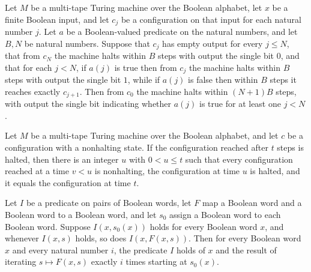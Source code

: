 \begin{theorem}
\label{Turing.loop_run}
\leanok
{}
Let $M$ be a multi-tape Turing machine over the Boolean alphabet, let $x$ be a finite
Boolean input, and let $c_j$ be a configuration on that input for each natural number
$j$. Let $a$ be a Boolean-valued predicate on the natural numbers, and let $B,N$ be
natural numbers. Suppose that $c_j$ has empty output for every $j\le N$, that from $c_N$
the machine halts within $B$ steps with output the single bit $0$, and that for each
$j<N$, if $a(j)$ is true then from $c_j$ the machine halts within $B$ steps with output
the single bit $1$, while if $a(j)$ is false then within $B$ steps it reaches exactly
$c_{j+1}$. Then from $c_0$ the machine halts within $(N+1)B$ steps, with output the
single bit indicating whether $a(j)$ is true for at least one $j<N$.
\end{theorem}

\begin{lemma}
\label{Turing.FinTM.loop_first_halt}
\leanok
{}
Let $M$ be a multi-tape Turing machine over the Boolean alphabet, and let $c$ be a
configuration with a nonhalting state. If the configuration reached after $t$ steps is
halted, then there is an integer $u$ with $0<u\le t$ such that every configuration
reached at a time $v<u$ is nonhalting, the configuration at time $u$ is halted, and it
equals the configuration at time $t$.
\end{lemma}

\begin{lemma}
\label{Turing.FinTM.loop_orbit_inv}
\leanok
{}
Let $I$ be a predicate on pairs of Boolean words, let $F$ map a Boolean word and a
Boolean word to a Boolean word, and let $s_0$ assign a Boolean word to each Boolean
word. Suppose $I(x,s_0(x))$ holds for every Boolean word $x$, and whenever $I(x,s)$
holds, so does $I(x,F(x,s))$. Then for every Boolean word $x$ and every natural number
$i$, the predicate $I$ holds of $x$ and the result of iterating $s\mapsto F(x,s)$
exactly $i$ times starting at $s_0(x)$.
\end{lemma}

